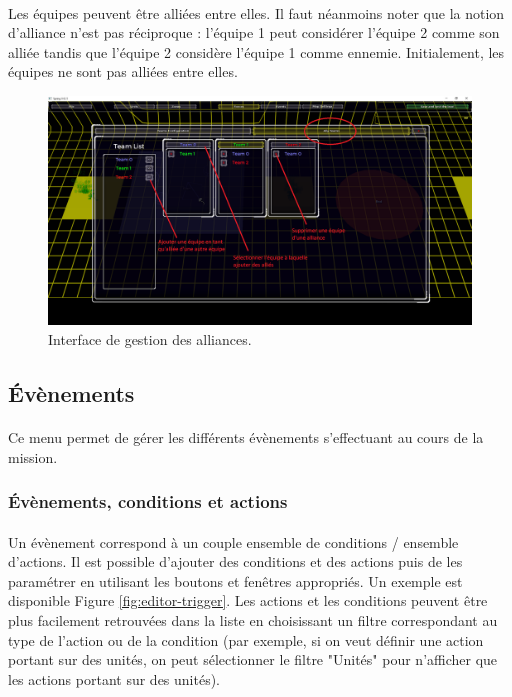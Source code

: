 \documentclass[a4paper]{article}
\begin{document}
\paragraph{ }
Les équipes peuvent être alliées entre elles. Il faut néanmoins noter que la notion d'alliance n'est pas réciproque : l'équipe 1 peut considérer l'équipe 2 comme son alliée tandis que l'équipe 2 considère l'équipe 1 comme ennemie. Initialement, les équipes ne sont pas alliées entre elles.
\begin{figure}[H]
\centering
\includegraphics[width=\linewidth]{editor-allyteam.png}
\caption{Interface de gestion des alliances.}
\label{fig:editor-allyteam}
\end{figure}
\subsection{Évènements}
\paragraph{ }
Ce menu permet de gérer les différents évènements s'effectuant au cours de la mission.
\subsubsection{Évènements, conditions et actions}
\paragraph{ }
Un évènement correspond à un couple ensemble de conditions / ensemble d'actions. Il est possible d'ajouter des conditions et des actions puis de les paramétrer en utilisant les boutons et fenêtres appropriés. Un exemple est disponible Figure \ref{fig:editor-trigger}. Les actions et les conditions peuvent être plus facilement retrouvées dans la liste en choisissant un filtre correspondant au type de l'action ou de la condition (par exemple, si on veut définir une action portant sur des unités, on peut sélectionner le filtre "Unités" pour n'afficher que les actions portant sur des unités).
\end{document}
